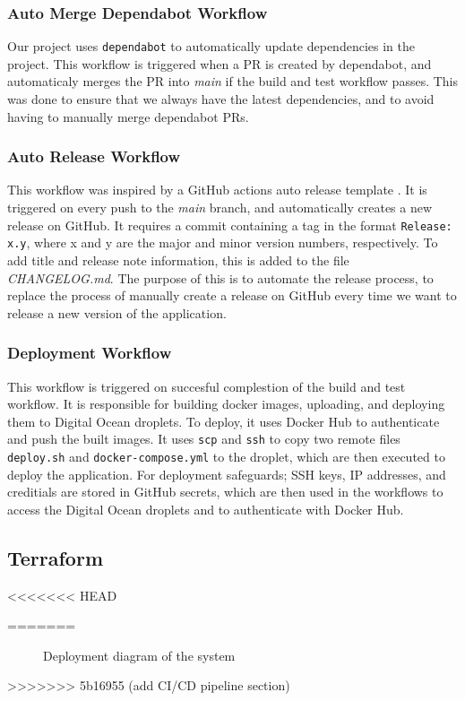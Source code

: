 \subsubsection{Auto Merge Dependabot Workflow}
Our project uses \texttt{dependabot} to automatically update dependencies in the project.
This workflow is triggered when a PR is created by dependabot, and automaticaly merges the PR into \textit{main} if the build and test workflow passes.
This was done to ensure that we always have the latest dependencies,
and to avoid having to manually merge dependabot PRs.
\subsubsection{Auto Release Workflow}
This workflow was inspired by a GitHub actions auto release template \cite{auto-release}.
It is triggered on every push to the \textit{main} branch, and automatically creates a new release on GitHub.
It requires a commit containing a tag in the format \texttt{Release: x.y}, where x and y are the major and minor version numbers, respectively.
To add title and release note information, this is added to the file \textit{CHANGELOG.md}.
The purpose of this is to automate the release process, to replace the process of manually create a release on GitHub every time 
we want to release a new version of the application.
\subsubsection{Deployment Workflow}
This workflow is triggered on succesful complestion of the build and test workflow.
It is responsible for building docker images, uploading, and deploying them to Digital Ocean droplets.
To deploy, it uses Docker Hub to authenticate and push the built images.
It uses \texttt{scp} and \texttt{ssh} to copy two remote files \texttt{deploy.sh} and \texttt{docker-compose.yml} to the droplet,
which are then executed to deploy the application.
For deployment safeguards; SSH keys, IP addresses, and creditials are stored in GitHub secrets,
which are then used in the workflows to access the Digital Ocean droplets and to authenticate with Docker Hub.

\subsection{Terraform}
<<<<<<< HEAD

=======
\begin{figure}
      \centering
      
      \caption{Deployment diagram of the system}
      \label{fig:deployment_diagram}
\end{figure}
>>>>>>> 5b16955 (add CI/CD pipeline section)


